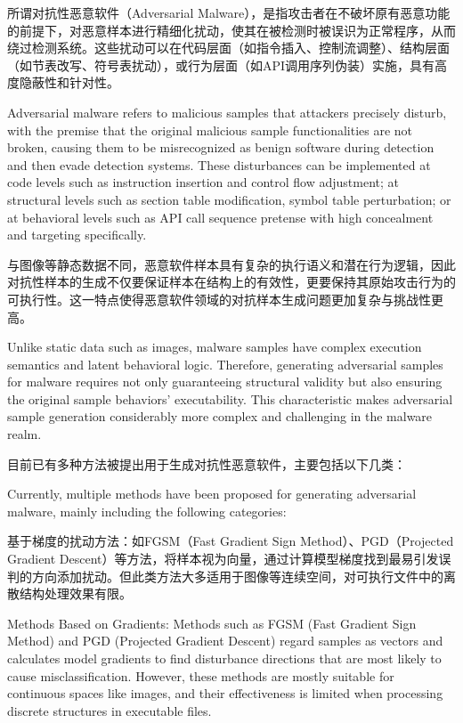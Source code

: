 所谓对抗性恶意软件（Adversarial Malware），是指攻击者在不破坏原有恶意功能的前提下，对恶意样本进行精细化扰动，使其在被检测时被误识为正常程序，从而绕过检测系统。这些扰动可以在代码层面（如指令插入、控制流调整）、结构层面（如节表改写、符号表扰动），或行为层面（如API调用序列伪装）实施，具有高度隐蔽性和针对性。

Adversarial malware refers to malicious samples that attackers precisely disturb, with the premise that the original malicious sample functionalities are not broken, causing them to be misrecognized as benign software during detection and then evade detection systems. These disturbances can be implemented at code levels such as instruction insertion and control flow adjustment; at structural levels such as section table modification, symbol table perturbation; or at behavioral levels such as API call sequence pretense with high concealment and targeting specifically.

与图像等静态数据不同，恶意软件样本具有复杂的执行语义和潜在行为逻辑，因此对抗性样本的生成不仅要保证样本在结构上的有效性，更要保持其原始攻击行为的可执行性。这一特点使得恶意软件领域的对抗样本生成问题更加复杂与挑战性更高。

Unlike static data such as images, malware samples have complex execution semantics and latent behavioral logic. Therefore, generating adversarial samples for malware requires not only guaranteeing structural validity but also ensuring the original sample behaviors' executability. This characteristic makes adversarial sample generation considerably more complex and challenging in the malware realm.


目前已有多种方法被提出用于生成对抗性恶意软件，主要包括以下几类：

Currently, multiple methods have been proposed for generating adversarial malware, mainly including the following categories:

基于梯度的扰动方法：如FGSM\cite{lupart2023study}（Fast Gradient Sign Method）、PGD\cite{bryniarski2021evading}（Projected Gradient Descent）等方法，将样本视为向量，通过计算模型梯度找到最易引发误判的方向添加扰动。但此类方法大多适用于图像等连续空间，对可执行文件中的离散结构处理效果有限。

Methods Based on Gradients: Methods such as FGSM\cite{lupart2023study} (Fast Gradient Sign Method) and PGD\cite{bryniarski2021evading} (Projected Gradient Descent) regard samples as vectors and calculates model gradients to find disturbance directions that are most likely to cause misclassification. However, these methods are mostly suitable for continuous spaces like images, and their effectiveness is limited when processing discrete structures in executable files.


